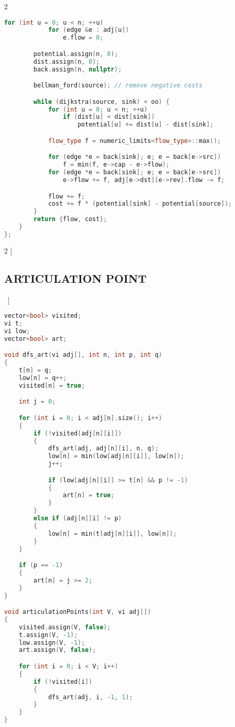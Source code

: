 \documentclass[leter]{amsart}
\begin{document}
\begin{multicols}{2}
\begin{lstlisting}[language=C++]
		for (int u = 0; u < n; ++u)
			for (edge &e : adj[u])
				e.flow = 0;

		potential.assign(n, 0);
		dist.assign(n, 0);
		back.assign(n, nullptr);

		bellman_ford(source); // remove negative costs

		while (dijkstra(source, sink) < oo) {
			for (int u = 0; u < n; ++u)
				if (dist[u] < dist[sink])
					potential[u] += dist[u] - dist[sink];

			flow_type f = numeric_limits<flow_type>::max();

			for (edge *e = back[sink]; e; e = back[e->src])
				f = min(f, e->cap - e->flow);
			for (edge *e = back[sink]; e; e = back[e->src])
				e->flow += f, adj[e->dst][e->rev].flow -= f;

			flow += f;
			cost += f * (potential[sink] - potential[source]);
		}
		return {flow, cost};
	}
};


\end{lstlisting}
\end{multicols}
\begin{multicols}{2}
[\subsection{ARTICULATION POINT}\ ]
\begin{lstlisting}[language=C++]
vector<bool> visited;
vi t;
vi low;
vector<bool> art;

void dfs_art(vi adj[], int n, int p, int q)
{
    t[n] = q;
    low[n] = q++;
    visited[n] = true;

    int j = 0;

    for (int i = 0; i < adj[n].size(); i++)
    {
        if (!visited[adj[n][i]])
        {
            dfs_art(adj, adj[n][i], n, q);
            low[n] = min(low[adj[n][i]], low[n]);
            j++;

            if (low[adj[n][i]] >= t[n] && p != -1)
            {
                art[n] = true;
            }
        }
        else if (adj[n][i] != p)
        {
            low[n] = min(t[adj[n][i]], low[n]);
        }
    }

    if (p == -1)
    {
        art[n] = j >= 2;
    }
}

void articulationPoints(int V, vi adj[])
{
    visited.assign(V, false);
    t.assign(V, -1);
    low.assign(V, -1);
    art.assign(V, false);

    for (int i = 0; i < V; i++)
    {
        if (!visited[i])
        {
            dfs_art(adj, i, -1, 1);
        }
    }
}


\end{lstlisting}
\end{multicols}
\enlargethispage*{\baselineskip}
\end{document}
